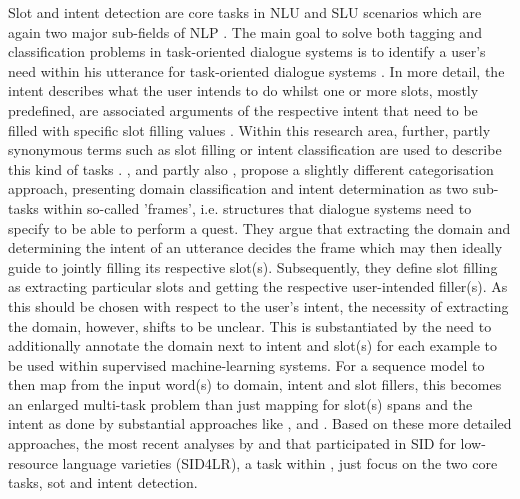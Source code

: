 \documentclass[11pt,a4paper,twoside,openright]{scrbook}
\begin{document}
Slot and intent detection are core tasks in NLU and SLU scenarios which are again two major sub-fields of NLP \citep{van-der-goot-etal-2021-masked}. The main goal to solve both tagging and classification problems in task-oriented dialogue systems is to identify a user's need within his utterance for task-oriented dialogue systems \citep{xu-etal-2020-end, larson2022survey}. In more detail, the intent describes what the user intends to do whilst one or more slots, mostly predefined, are associated arguments of the respective intent that need to be filled with specific slot filling values \citep{tur_atis_2010, schuster-etal-2019-cross-lingual, razumovskaia-etal-2022-data}. Within this research area, further, partly synonymous terms such as slot filling or intent classification are used to describe this kind of tasks \citep{louvan-magnini-2020-recent}. \citet{jurafsky_martin_processing}, and partly also \citep{schuster-etal-2019-cross-lingual}, propose a slightly different categorisation approach, presenting domain classification and intent determination as two sub-tasks within so-called 'frames', i.e. structures that dialogue systems need to specify to be able to perform a quest. They argue that extracting the domain and determining the intent of an utterance decides the frame which may then ideally guide to jointly filling its respective slot(s). Subsequently, they define slot filling as extracting particular slots and getting the respective user-intended filler(s). As this should be chosen with respect to the user's intent, the necessity of extracting the domain, however, shifts to be unclear. This is substantiated by the need to additionally annotate the domain next to intent and slot(s) for each example to be used within supervised machine-learning systems. For a sequence model to then map from the input word(s) to domain, intent and slot fillers, this becomes an enlarged multi-task problem than just mapping for slot(s) spans and the intent as done by substantial approaches like \citet{van-der-goot-etal-2021-masked}, \citet{chen2019bertjointintentclassification} and \citet{qin2021multidomainspokenlanguageunderstanding}. Based on these more detailed approaches, the most recent analyses by \citet{kwon-etal-2023-sidlr} and \citet{srivastava-chiang-2023-fine} that participated in SID for low-resource language varieties (SID4LR), a task within \citet{2023-findings-vardial}, just focus on the two core tasks, sot and intent detection. 
\end{document}
